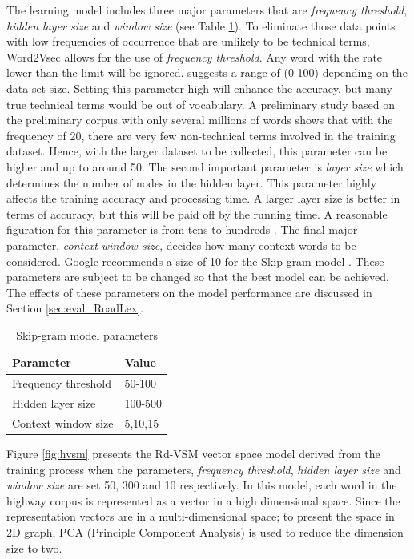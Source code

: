 \documentclass[Journal, BackFigs,NoLists, DoubleSpace]{ascelike}%
\begin{document}
%
\par
The learning model includes three major parameters that are \textit{frequency threshold}, \textit{hidden layer size} and \textit{window size} (see Table \ref{table:nn-parameters}). To eliminate those data points with low frequencies of occurrence that are unlikely to be technical terms, Word2Vsec allows for the use of \textit{frequency threshold}. Any word with the rate lower than the limit will be ignored.  suggests a range of (0-100) depending on the data set size. Setting this parameter high will enhance the accuracy, but many true technical terms would be out of vocabulary. A preliminary study based on the preliminary corpus with only several millions of words shows that with the frequency of 20, there are very few non-technical terms involved in the training dataset. Hence, with the larger dataset to be collected, this parameter can be higher and up to around 50. The second important parameter is \textit{layer size} which determines the number of nodes in the hidden layer. This parameter highly affects the training accuracy and processing time. A larger layer size is better in terms of accuracy, but this will be paid off by the running time. A reasonable figuration for this parameter is from tens to hundreds \cite{rehurek14}. The final major parameter, \textit{context window size}, decides how many context words to be considered. Google recommends a size of 10 for the Skip-gram model \cite{google2016}. These parameters are subject to be changed so that the best model can be achieved. The effects of these parameters on the model performance are discussed in Section \ref{sec:eval_RoadLex}.
%
\begin{table} [t]
	\caption{Skip-gram model parameters}
	\label{table:nn-parameters}
	\centering
	\small
	\renewcommand{\arraystretch}{1.25}
	\begin{tabular}{l l}
		\hline
		\textbf{Parameter} & \textbf{Value}\\
		\hline
		Frequency threshold & 50-100\\
		Hidden layer size		&	100-500\\
		Context window size	&	5,10,15\\
		\hline
	\end{tabular}
	\normalsize
\end{table}
%
\par
Figure \ref{fig:hvsm} presents the Rd-VSM vector space model derived from the training process when the parameters, \textit{frequency threshold}, \textit{hidden layer size} and \textit{window size} are set 50, 300 and 10 respectively. In this model, each word in the highway corpus is represented as a vector in a high dimensional space. Since the representation vectors are in a multi-dimensional space; to present the space in 2D graph, PCA (Principle Component Analysis) is used to reduce the dimension size to two.
\end{document}
